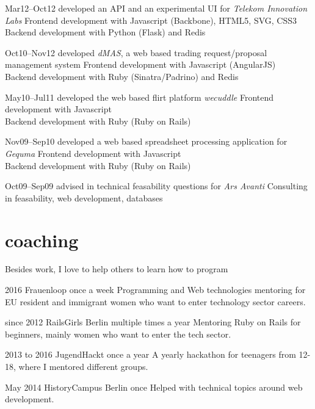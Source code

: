 \documentclass[]{friggeri-cv}
\begin{document}
\begin{entrylist}
  \entry
    {Mar12–Oct12}
    {developed an API and an experimental UI for \emph{Telekom Innovation Labs}}
    {}
    {Frontend development with Javascript (Backbone), HTML5, SVG, CSS3\\
     Backend development with Python (Flask) and Redis}

  \entry
    {Oct10–Nov12}
    {developed \emph{dMAS}, a web based trading request/proposal management system}
    {}
    {Frontend development with Javascript (AngularJS)\\
     Backend development with Ruby (Sinatra/Padrino) and Redis}

  \entry
    {May10–Jul11}
    {developed the web based flirt platform \emph{wecuddle}}
    {}
    {Frontend development with Javascript\\
     Backend development with Ruby (Ruby on Rails)}

  \entry
    {Nov09–Sep10}
    {developed a web based spreadsheet processing application for \emph{Gequma}}
    {}
    {Frontend development with Javascript\\
     Backend development with Ruby (Ruby on Rails)}

  \entry
    {Oct09–Sep09}
    {advised in technical feasability questions for \emph{Ars Avanti}}
    {}
    {Consulting in feasability, web development, databases}


\end{entrylist}


\pagebreak
\section{coaching}
Besides work, I love to help others to learn how to program

\begin{entrylist}
  \entry
    {2016}
    {Frauenloop}
    {once a week}
    {Programming and Web technologies mentoring for EU resident and immigrant women who want to enter technology sector careers.}

  \entry
    {since 2012}
    {RailsGirls Berlin}
    {multiple times a year}
    {Mentoring Ruby on Rails for beginners, mainly women who want to enter the tech sector.}

  \entry
    {2013 to 2016}
    {JugendHackt}
    {once a year}
    {A yearly hackathon for teenagers from 12-18, where I mentored different groups.}

  \entry
    {May 2014}
    {HistoryCampus Berlin}
    {once}
    {Helped with technical topics around web development.}

\end{entrylist}
\end{document}
